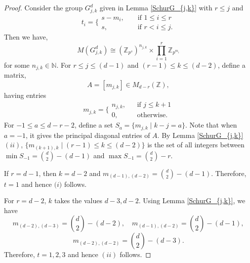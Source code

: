 \documentclass[10pt,a4paper]{amsart}
\newcommand{\Z}{\mathbb{Z}}
\newcommand{\sabnam}[1]{{\color{red} #1}}
\begin{document}
\begin{proof}
  Consider the group $G_{j,k}^d$ given in Lemma \ref{SchurG_{j,k}} with $r \le j$ and
 \[t_i=\biggl\{ 
\begin{array}{lcl}
s-m_i, && \text{ if } 1 \le i \le r\\
s, && \text{ if }r<i\le j.
	     \end{array}
\]
 Then we have,
$$M(G_{j,k}^d) \cong (\Z_{p^s})^{n_{j,k}} \times\prod_{i=1}^{r}\Z_{p^{m_i}} $$
for some $n_{j,k} \in \mathbb{N}$.  
 For $r \le j \le (d-1)$ and $(r-1) \le k \le (d-2)$, define a matrix,
 $$A=[m_{j,k}] \in M_{d-r}(\mathbb Z),$$
having entries
\[ m_{j,k}=\biggl\{ 
\begin{array}{lcl}
n_{j,k}, && \text{if } j \leq k+1\\
0, && \text{otherwise}.
	     \end{array}
\]
For $-1 \leq a \leq d-r-2$,   define a set ${S_a=\{m_{j,k}\mid k-j=a\}}$. %
  Note that when $a=-1$, it gives the principal diagonal entries of $A$. By Lemma \ref{SchurG_{j,k}}$(ii)$, ${\{m_{(k+1),k} \mid (r-1) \le k \le (d-2)\}}$ is the set of all integers between ${\min S_{-1}=\binom{d}{2}-(d-1)}$ and $\max S_{-1}={\binom{d}{2}-r}$. 
  
If $r=d-1$, then $k=d-2$ and $m_{(d-1),(d-2)}=\binom{d}{2}-(d-1)$. Therefore,
$t=1$ and hence $\textit{(i)}$ follows.

For $r=d-2$, $k$ takes the values $d-3,d-2$. Using Lemma \ref{SchurG_{j,k}}, we have 
$$m_{(d-2),(d-3)}=\binom{d}{2}-(d-2),\quad m_{(d-1),(d-2)}=\binom{d}{2}-(d-1),$$
$$m_{(d-2),(d-2)}=\binom{d}{2}-(d-3).$$
Therefore, $t=1,2,3$ and hence $(ii)$ follows.


\end{proof}
\end{document}
